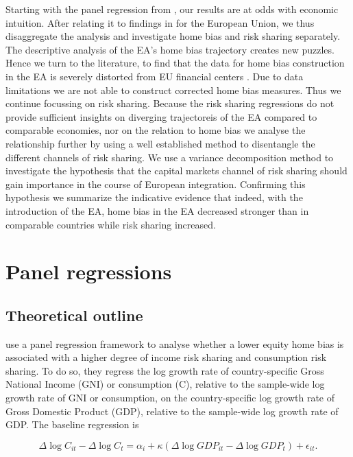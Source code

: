 \documentclass[12pt,a4paper]{article}
\begin{document}
Starting with the panel regression from \textcite{main}, our results are at odds with economic intuition. After relating it to findings in \textcite{main} for the European Union,
we thus disaggregate the analysis and investigate home bias and risk sharing separately. The descriptive analysis of the EA's home bias trajectory creates new puzzles. Hence we turn to the literature,
to find that the data for home bias construction in the EA is severely distorted from EU financial centers \cite{NBER...}. Due to data limitations we are not able
to construct corrected home bias measures. Thus we continue focussing on risk sharing. Because the risk sharing regressions do not provide sufficient
insights on diverging trajectoreis of the EA compared to comparable economies, nor on the relation to home bias we analyse the relationship further by 
using a well established method to disentangle the different channels of risk sharing. We use 
a variance decomposition method to investigate the hypothesis that the capital markets channel of risk sharing should gain importance in the course of European integration.
Confirming this hypothesis we summarize the indicative evidence that indeed, with the introduction of the EA, home bias in the EA decreased stronger than in 
comparable countries while risk sharing increased.

\section{Panel regressions}
\subsection{Theoretical outline}

\textcite{main} use a panel regression framework to analyse whether a lower equity home bias is associated with a higher degree of income risk
sharing and consumption risk sharing. To do so, they regress the log growth rate of
country-specific Gross National Income (GNI) or consumption (C), relative to the
sample-wide log growth rate of GNI or consumption, on the country-specific log growth
rate of Gross Domestic Product (GDP), relative to the sample-wide log growth rate of
GDP. The baseline regression is

\begin{equation}
\Delta \log C_{it} - \Delta \log C_t
=
\alpha_i
+
\kappa
\left(
\Delta \log GDP_{it} - \Delta \log GDP_t
\right)
+
\epsilon_{it}.
\end{equation}
\end{document}
